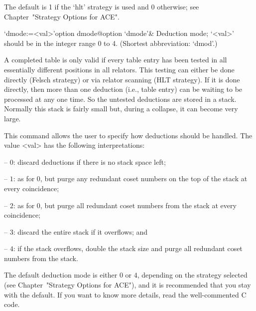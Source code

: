 \endlist

The default is 1 if the `hlt' strategy is used and  0  otherwise;  see
Chapter~"Strategy Options for ACE".

\enditems


\beginitems

\>`dmode:=<val>'{option dmode}@{option `dmode'}&
Deduction mode; `<val>' should be in the integer range 0 to 4.
(Shortest abbreviation: `dmod'.)

A completed table  is only valid if every table  entry has been tested
in all essentially different  positions in all relators.  This testing
can either be done directly  (Felsch strategy) or via relator scanning
(HLT strategy).  If it is  done directly, then more than one deduction
(i.e., table  entry) can be waiting  to be processed at  any one time.
So the untested deductions are stored in a stack.  Normally this stack
is fairly small but, during a collapse, it can become very large.

This command allows the user  to  specify  how  deductions  should  be
handled. The value <val> has the following interpretations:

\beginlist

\item{--} $0$:  
discard deductions if there is no stack space left;

\item{--} $1$: 
as for $0$, but purge any redundant coset numbers on the  top  of  the
stack at every coincidence;

\item{--} $2$: 
as for 0, but purge all redundant coset  numbers  from  the  stack  at
every coincidence;

\item{--} $3$:
discard the entire stack if it overflows; and

\item{--} $4$:
if the stack overflows, double the stack size and purge all  redundant
coset numbers from the stack.

\endlist

The default deduction mode is either $0$  or  $4$,  depending  on  the
strategy selected (see Chapter~"Strategy Options for ACE"), and it  is
recommended that you stay with the default. If you want to  know  more
details, read the well-commented C code.


